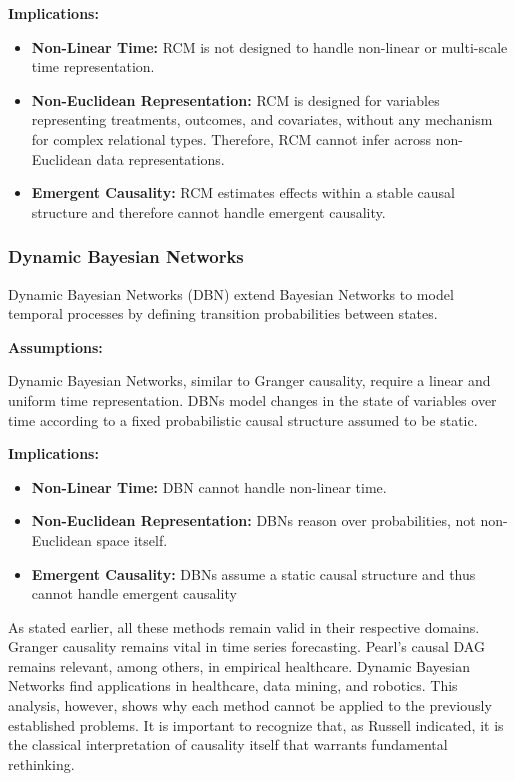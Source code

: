 \documentclass{article}
\begin{document}
\textbf{Implications:}

\begin{itemize}
    \item \textbf{Non-Linear Time:} RCM is not designed to handle non-linear or multi-scale time representation.
    \item \textbf{Non-Euclidean Representation:} RCM is designed for variables representing treatments, outcomes, and covariates, without any mechanism for complex relational types. Therefore, RCM cannot infer across non-Euclidean data representations.
    \item \textbf{Emergent Causality:} RCM estimates effects within a stable causal structure and therefore cannot handle emergent causality.
\end{itemize}

\subsubsection{Dynamic Bayesian Networks}

Dynamic Bayesian Networks\cite{dagum1992dynamic} (DBN) extend Bayesian Networks to model temporal processes by defining transition probabilities between states.

\textbf{Assumptions:}

Dynamic Bayesian Networks, similar to Granger causality, require a linear and uniform time representation. DBNs model changes in the state of variables over time according to a fixed probabilistic causal structure assumed to be static.


\textbf{Implications:}

\begin{itemize}
    \item \textbf{Non-Linear Time:} DBN cannot handle non-linear time.
    \item \textbf{Non-Euclidean Representation:} DBNs reason over probabilities, not non-Euclidean space itself.
    \item \textbf{Emergent Causality:}  DBNs assume a static causal structure and thus cannot handle emergent causality
\end{itemize}

As stated earlier, all these methods remain valid in their respective domains. Granger causality remains vital in time series forecasting. Pearl’s causal DAG remains relevant, among others, in empirical healthcare. Dynamic Bayesian Networks find applications in healthcare, data mining, and robotics. This analysis, however, shows why each method cannot be applied to the previously established problems. It is important to recognize that, as Russell indicated, it is the classical interpretation of causality itself that warrants fundamental rethinking.
\end{document}
